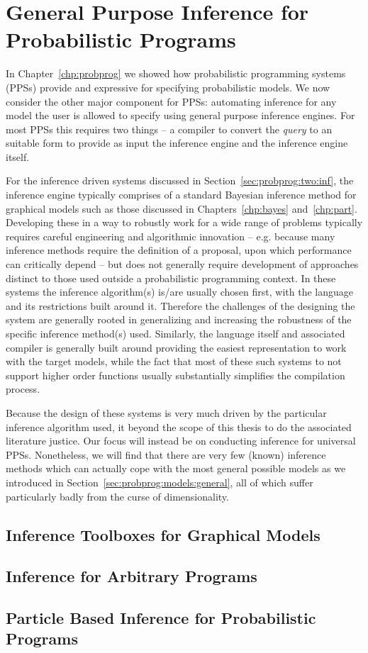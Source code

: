 
\chapter{General Purpose Inference for Probabilistic Programs}
\label{chp:proginf}

In Chapter~\ref{chp:probprog} we showed how probabilistic programming systems (PPSs) provide
and expressive for specifying probabilistic models.  We now consider the other major component
for PPSs: automating inference for any model the user is allowed to specify using general purpose
inference engines.  For most PPSs this requires two things --  a compiler to convert the \emph{query} to an
suitable form to provide as input the inference engine and the inference engine itself.  

For the inference
driven systems discussed in Section~\ref{sec:probprog:two:inf}, the inference engine typically comprises of
a standard Bayesian inference method for graphical models such as those discussed in Chapters~\ref{chp:bayes}
and~\ref{chp:part}.  Developing these in a way to robustly work for a wide range of problems typically
requires careful engineering and algorithmic innovation -- e.g. because many inference methods require the definition of
a proposal, upon which performance can critically depend -- but does not generally require development 
of approaches distinct to those used outside a probabilistic programming context.  In these 
systems the inference algorithm(s) is/are usually chosen first, with the language and its restrictions built around it.
Therefore the challenges of the designing the system are generally rooted in generalizing and increasing the robustness of the 
specific inference method(s) used.  Similarly, the language itself and associated compiler is generally built
around providing the easiest representation to work with the target models, while the fact that most of
these such systems to not support higher order functions usually substantially simplifies the compilation
process.

Because the design of these systems is very much driven by the particular inference algorithm used, it
beyond the scope of this thesis to do the associated literature justice.  Our focus will instead be on 
conducting inference for universal PPSs.  Nonetheless, we will find that there are very few (known) inference
methods which can actually cope with the most general possible models as we introduced in
Section~\ref{sec:probprog:models:general}, all of which suffer particularly badly from the curse of
dimensionality.

\section{Inference Toolboxes for Graphical Models}
\label{sec:proginf:tool}

\section{Inference for Arbitrary Programs}
\label{sec:proginf:inf}

\section{Particle Based Inference for Probabilistic Programs}
\label{sec:proginf:probprog}